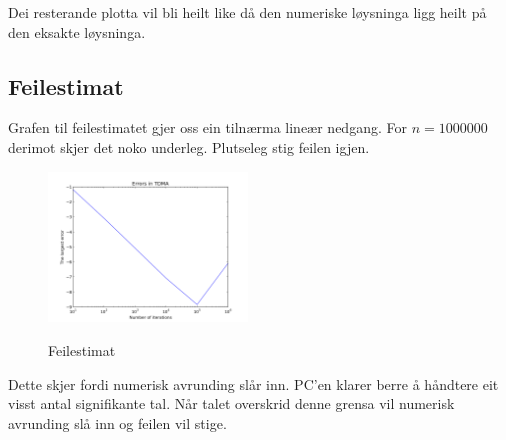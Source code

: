 \documentclass[11pt, a4paper]{article}
\begin{document}
    Dei resterande plotta vil bli heilt like då den numeriske løysninga ligg heilt på den 
    eksakte løysninga.

  \subsection{Feilestimat}
    Grafen til feilestimatet gjer oss ein tilnærma lineær nedgang. For $n = 1000000$ derimot skjer 
    det noko underleg. Plutseleg stig feilen igjen. 

    \begin{figure}
      \centering
      \includegraphics[width=200px]{ERROR.png} \\
      \caption{Feilestimat}
    \end{figure}

    Dette skjer fordi numerisk avrunding slår inn. PC'en klarer berre å håndtere eit visst antal
    signifikante tal. Når talet overskrid denne grensa vil numerisk avrunding slå inn og feilen vil
    stige.
\end{document}
